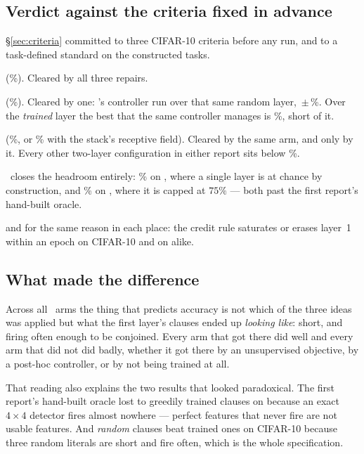 \subsection{Verdict against the criteria fixed in advance}
\label{sec:verdict}

\S\ref{sec:criteria} committed to three CIFAR-10 criteria before any run, and to a
task-defined standard on the constructed tasks.

\begin{ttkey}
 (\accMctm{}\%). Cleared by all three repairs.

 (\accMctmRandom{}\%). Cleared by one:
\ideaB's controller run over that same random layer, \randBestAcc\,$\pm$\,\randBestSd{}\%.
Over the \emph{trained} layer the best that the same controller manages is \sizeBestAcc{}\%,
short of it.

 (\accSingleMatched{}\%, or
\accSingleRf{}\% with the stack's receptive field). Cleared by the same arm, and only by it.
Every other two-layer configuration in either report sits below \accSingleRf{}\%.

 \ideaA\ closes the headroom entirely:
\synNearAutoAuto{}\% on , where a single layer is at chance by construction, and
\synXorAutoAuto{}\% on , where it is capped at $75\%$ --- both past the first
report's hand-built oracle.

 and for the same reason in each place: the credit rule
saturates or erases layer~1 within an epoch on CIFAR-10 and on  alike.
\end{ttkey}

\subsection{What made the difference}

Across all \nArms\ arms the thing that predicts accuracy is not which of the three ideas was
applied but what the first layer's clauses ended up \emph{looking like}: short, and firing
often enough to be conjoined. Every arm that got there did well and every arm that did not did
badly, whether it got there by an unsupervised objective, by a post-hoc controller, or by not
being trained at all.

That reading also explains the two results that looked paradoxical. The first report's
hand-built oracle lost to greedily trained clauses on  because an exact
$4\times4$ detector fires almost nowhere --- perfect features that never fire are not usable
features. And \emph{random} clauses beat trained ones on CIFAR-10 because three random literals
are short and fire often, which is the whole specification.

